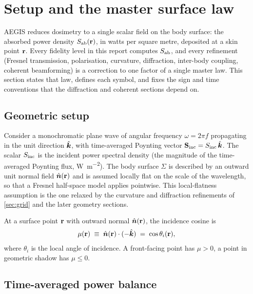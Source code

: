 \section{Setup and the master surface law}\label{sec:surface-law}

AEGIS reduces dosimetry to a single scalar field on the body surface: the
absorbed power density $S_{\mathrm{ab}}(\mathbf{r})$, in watts per square metre, deposited at a
skin point $\mathbf{r}$. Every fidelity level in this report computes $S_{\mathrm{ab}}$, and
every refinement (Fresnel transmission, polarisation, curvature, diffraction,
inter-body coupling, coherent beamforming) is a correction to one factor of a
single master law. This section states that law, defines each symbol, and
fixes the sign and time conventions that the diffraction and coherent sections
depend on.

\subsection{Geometric setup}\label{sec:setup-geometry}

Consider a monochromatic plane wave of angular frequency $\omega = 2\pi f$
propagating in the unit direction $\hat{\bm{k}}$, with time-averaged Poynting vector
$\mathbf{S}_{\mathrm{inc}} = S_{\mathrm{inc}}\,\hat{\bm{k}}$. The scalar $S_{\mathrm{inc}}$ is the incident
power spectral density (the magnitude of the time-averaged Poynting flux,
\si{\watt\per\square\metre}). The body surface $\Sigma$ is described by an
outward unit normal field $\hat{\bm{n}}(\mathbf{r})$ and is assumed locally flat on the scale
of the wavelength, so that a Fresnel half-space model applies pointwise. This
local-flatness assumption is the one relaxed by the curvature and diffraction
refinements of \cref{sec:grid} and the later geometry sections.

\begin{definition}\label{def:mu}
At a surface point $\mathbf{r}$ with outward normal $\hat{\bm{n}}(\mathbf{r})$, the incidence cosine
is
\begin{equation}\label{eq:mu-def}
  \mu(\mathbf{r}) \;\equiv\; \hat{\bm{n}}(\mathbf{r})\cdot(-\hat{\bm{k}}) \;=\; \cos\theta_i(\mathbf{r}),
\end{equation}
where $\theta_i$ is the local angle of incidence. A front-facing point has
$\mu > 0$, a point in geometric shadow has $\mu \le 0$.
\end{definition}

\subsection{Time-averaged power balance}\label{sec:power-balance}

